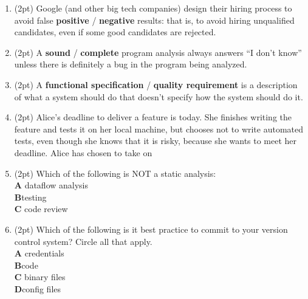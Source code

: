 \documentclass{report}
\newif\ifkey
\newcommand{\correct}[1]{\ifkey\color{red}\textbf{#1}\color{black}\else\textbf{#1}\fi\xspace}
\newcommand{\answershort}[1]{\ifkey\color{red}\underline{\textbf{#1}}\color{black}\else\underline{\hspace{3in}}\fi\xspace}
\newcommand{\vshortpts}{20}
\newcommand*{\pts}[1]{\addtocounter{points}{#1}(#1pt)}
\begin{document}
\begin{spacing}{1.4}
\begin{enumerate}[leftmargin=*]
  \newpage

  \textbf{II. Multiple Choice and Very Short Answer (\vshortpts pts).} In the following section, either circle your
  answer (possible answers appear in \textbf{bold}) or write a very short (one word or one phrase) answer in the space provided.

\item \pts{2} Google (and other big tech companies) design their hiring process
  to avoid false \correct{positive} / \textbf{negative} results: that is, to avoid hiring unqualified candidates,
  even if some good candidates are rejected.

\item \pts{2} A \textbf{sound} / \correct{complete} program analysis always answers ``I don't know'' unless there
  is definitely a bug in the program being analyzed.

\item \pts{2} A \correct{functional specification} / \textbf{quality requirement} is a description of what a system should do that doesn’t specify how the system should do it.

\item \pts{2} Alice's deadline to deliver a feature is today. She finishes writing the feature and tests it on her local machine, but chooses not to write automated tests,
  even though she knows that it is risky, because
  she wants to meet her deadline. Alice has chosen to take on \answershort{technical debt}

\item \pts{2}
  Which of the following is NOT a static analysis:
  \\ \textbf{A}\hspace{0.2in} dataflow analysis
  \\ \correct{B}\hspace{0.2in}testing
  \\ \textbf{C}\hspace{0.2in} code review

\item \pts{2}
  Which of the following is it best practice to commit to your version control system? Circle all that apply.
  \\ \textbf{A}\hspace{0.2in} credentials
  \\ \correct{B}\hspace{0.2in}code
  \\ \textbf{C}\hspace{0.2in} binary files
  \\ \correct{D}\hspace{0.2in}config files


\end{enumerate}
\end{spacing}
\end{document}
